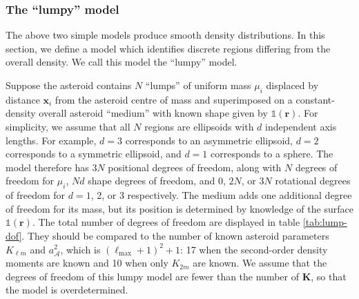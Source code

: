 \subsubsection{The ``lumpy'' model}
\label{sec:lumpy}

The above two simple models produce smooth density distributions. In this section, we define a model which identifies discrete regions differing from the overall density. We call this model the ``lumpy'' model.

Suppose the asteroid contains $N$ ``lumps'' of uniform mass $\mu_i$ displaced by distance $\bm x_i$ from the asteroid centre of mass and superimposed on a constant-density overall asteroid ``medium'' with known shape given by $\mathds{1}(\bm r)$. For simplicity, we assume that all $N$ regions are ellipsoids with $d$ independent axis lengths. For example, $d=3$ corresponds to an asymmetric ellipsoid, $d=2$ corresponds to a symmetric ellipsoid, and $d=1$ corresponds to a sphere. The model therefore has $3N$ positional degrees of freedom, along with $N$ degrees of freedom for $\mu_i$, $Nd$ shape degrees of freedom, and 0, $2N$, or $3N$ rotational degrees of freedom for $d=1$, 2, or 3 respectively. The medium adds one additional degree of freedom for its mass, but its position is determined by knowledge of the surface $\mathds{1}(\bm r)$. The total number of degrees of freedom are displayed in table \ref{tab:lump-dof}. They should be compared to the number of known asteroid parameters $K_{\ell m}$ and $a_\mathcal{A}^2$, which is $(\ell_\text{max}+1)^2+1$: 17 when the second-order density moments are known and 10 when only $K_{2m}$ are known. We assume that the degrees of freedom of this lumpy model are fewer than the number of $\bm K$, so that the model is overdetermined.


